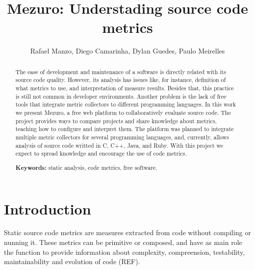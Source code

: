 \documentclass{llncs}
\begin{document}
\sloppy
\title{Mezuro: Understading source code metrics}

\author{Rafael Manzo, Diego Camarinha,
        Dylan Guedes, Paulo Meirelles}


\maketitle
\begin{abstract}
  The ease of development and maintenance of a software is directly related
with its source code quality.
  However, its analysis has issues like, for instance, definition of what
metrics to use, and interpretation of measure results. Besides that, this practice
is still not common in developer environments. Another problem is the lack of
free tools that integrate metric collectors to different programming languages.
In this work we present Mezuro, a free web platform to collaboratively evaluate
source code. The project provides ways to compare projects and share knowledge
about metrics, teaching how to configure and interpret them. The platform was
planned to integrate multiple metric collectors for several programming
languages, and, currently, allows analysis of source code writted in C, C++,
Java, and Ruby.
    With this project we expect to spread knowledge and encourage the use of
code metrics.

\textbf{Keywords:} static analysis, code metrics, free software.
\end{abstract}

\section{Introduction}
\label{sec:intro}

Static source code metrics are measures extracted from code without compiling
or nunning it. These metrics can be primitive or composed, and have as main
role the function to provide information about complexity, compreension,
testability, maintainability and evolution of code (REF).
\end{document}
